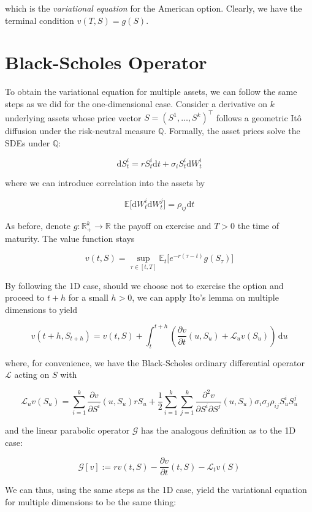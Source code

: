 which is the \textit{variational equation} \cite{jo2019variational} for the American option. Clearly, we have the terminal condition $v(T, S) = g(S)$.

\section{Black-Scholes Operator}

To obtain the variational equation for multiple assets, we can follow the same steps as we did for the one-dimensional case. Consider a derivative on $k$ underlying assets whose price vector $S = (S^1 , \dots, S^k)^\top$ follows a geometric Itô diffusion under the risk-neutral measure $\mathbb Q$. Formally, the asset prices solve the SDEs under $\mathbb Q$:

$$
\mathrm dS_t^i = rS_t^i\mathrm dt + \sigma_i S^i_t \mathrm dW_t^i
$$

where we can introduce correlation into the assets by

$$
\mathbb E\big[\mathrm dW_t^i \mathrm dW_t^j\big] = \rho_{ij}\mathrm dt
$$

As before, denote $g:\mathbb R^k_+ \to \mathbb R$ the payoff on exercise and $T>0$ the time of maturity. The value function stays

$$
v(t, S) = \sup_{\tau \in [t, T]} \mathbb E_t\big[e^{-r(\tau - t)}g(S_\tau)\big]
$$

By following the 1D case, should we choose not to exercise the option and proceed to $t+h$ for a small $h > 0$, we can apply Ito’s lemma on multiple dimensions to yield

$$
v(t+h, S_{t+h})= v(t, S) + \int_t^{t+h} \left(\frac{\partial v}{\partial t}(u, S_u) + \mathcal L_u v(S_u)\right)\,\mathrm du
$$

where, for convenience, we have the Black-Scholes ordinary differential operator $\mathcal L$ acting on $S$ with

$$
\mathcal L_uv(S_u) = \sum_{i=1}^k\frac{\partial v}{\partial S^i}(u, S_u)rS_u + \frac 12 \sum_{i=1}^k\sum_{j=1}^k \frac{\partial^2 v}{\partial S^i\partial S^j}(u, S_u) \sigma_i\sigma_j \rho_{ij} S^i_uS^j_u
$$

and the linear parabolic operator $\mathcal G$ has the analogous definition as to the 1D case:

$$\mathcal G[v]:= rv(t, S) - \frac{\partial v}{\partial t}(t, S) - \mathcal L_tv(S)$$

We can thus, using the same steps as the 1D case, yield the variational equation for multiple dimensions to be the same thing:


